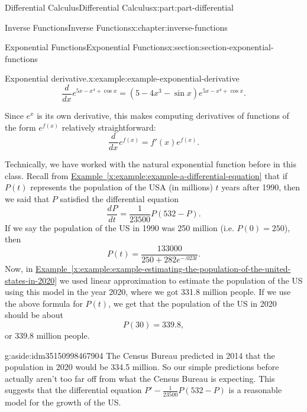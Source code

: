 \documentclass[twoside,10pt,]{book}
\newcommand{\xreffont}{\relax}
\numberwithin{equation}{part}
\newcommand{\dv}[3][]{\dfrac{d^{#1} #2}{d #3^{#1}}}
\begin{document}
\begin{partptx}{Differential Calculus}{}{Differential Calculus}{}{}{x:part:part-differential}
\begin{chapterptx}{Inverse Functions}{}{Inverse Functions}{}{}{x:chapter:inverse-functions}
\begin{sectionptx}{Exponential Functions}{}{Exponential Functions}{}{}{x:section:section-exponential-functions}
\begin{example}{Exponential derivative.}{x:example:example-exponential-derivative}
\begin{equation*}
\dv{}{x}e^{5x - x^{4} + \cos x} = (5 - 4x^{3} - \sin x)e^{5x - x^{4} + \cos x}.
\end{equation*}
%
\end{example}
Since \(e^{x}\) is its own derivative, this makes computing derivatives of functions of the form \(e^{f(x)}\) relatively straightforward:%
\begin{equation*}
\dv{}{x}e^{f(x)} = f'(x)e^{f(x)}.
\end{equation*}
%
\par
Technically, we have worked with the natural exponential function before in this class. Recall from \hyperref[x:example:example-a-differential-equation]{Example~{\xreffont\ref{x:example:example-a-differential-equation}}} that if \(P(t)\) represents the population of the USA (in millions) \(t\) years after 1990, then we said that \(P\) satisfied the differential equation%
\begin{equation*}
\dv{P}{t} = \frac{1}{23500}P(532 - P).
\end{equation*}
If we say the population of the US in 1990 was 250 million (i.e. \(P(0) = 250\)), then%
\begin{equation*}
P(t) = \frac{133000}{250 + 282e^{-.023t}}.
\end{equation*}
Now, in \hyperref[x:example:example-estimating-the-population-of-the-united-states-in-2020]{Example~{\xreffont\ref{x:example:example-estimating-the-population-of-the-united-states-in-2020}}} we used linear approximation to estimate the population of the US using this model in the year 2020, where we got 331.8 million people. If we use the above formula for \(P(t)\), we get that the population of the US in 2020 should be about%
\begin{equation*}
P(30) = 339.8,
\end{equation*}
or 339.8 million people.%
\begin{aside}{}{g:aside:idm35150998467904}%
The Census Bureau predicted in 2014 that the population in 2020 would be 334.5 million. So our simple predictions before actually aren't too far off from what the Census Bureau is expecting. This suggests that the differential equation \(P' - \frac{1}{23500}P(532-P)\) is a reasonable model for the growth of the US.%
\end{aside}
\end{sectionptx}
%
%
\typeout{************************************************}
\typeout{************************************************}

\end{chapterptx}
\end{partptx}
\end{document}
